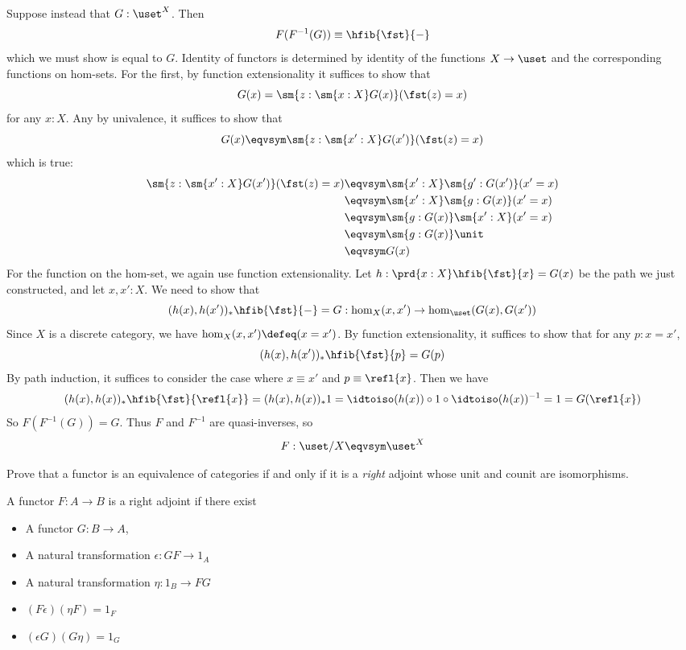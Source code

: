 Suppose instead that $G : \uset^{X}$.  Then
\[
  F(F^{-1}(G)) \equiv \hfib{\fst}{-}
\]
which we must show is equal to $G$.  Identity of functors is determined by
identity of the functions $X \to \uset$ and the corresponding functions on
hom-sets.  For the first, by function extensionality it suffices to show that
\[
  G(x)
  =
  \sm{z : \sm{x:X}G(x)}(\fst(z) = x)
\]
for any $x : X$.  Any by univalence, it suffices to show that 
\[
  G(x)
  \eqvsym
  \sm{z : \sm{x':X}G(x')}(\fst(z) = x)
\]
which is true:
\begin{align*}
  \sm{z : \sm{x':X}G(x')}(\fst(z) = x)
  &\eqvsym \sm{x':X}\sm{g':G(x')}(x'=x)
  \\&\eqvsym \sm{x':X}\sm{g:G(x)}(x'=x)
  \\&\eqvsym \sm{g:G(x)}\sm{x':X}(x'=x)
  \\&\eqvsym \sm{g:G(x)}\unit
  \\&\eqvsym G(x)
\end{align*}
For the function on the hom-set, we again use function extensionality.  Let $h
: \prd{x:X} \hfib{\fst}{x} = G(x)$ be the path we just constructed, and let
$x, x' : X$.  We need to show that
\[
  (h(x), h(x'))_{*}\hfib{\fst}{-} = G 
  : \hom_{X}(x, x') \to \hom_{\uset}(G(x), G(x'))
\]
Since $X$ is a discrete category, we have $\hom_{X}(x, x') \defeq (x = x')$.
By function extensionality, it suffices to show that for any $p : x = x'$,
\[
  (h(x), h(x'))_{*}\hfib{\fst}{p} = G(p)
\]
By path induction, it suffices to consider the case where $x \equiv x'$ and $p
\equiv \refl{x}$.  Then we have
\[
  (h(x), h(x))_{*}\hfib{\fst}{\refl{x}}
  =
  (h(x), h(x))_{*}1
  = 
  \idtoiso(h(x)) \circ 1 \circ \idtoiso(h(x))^{-1}
  =
  1
  =
  G(\refl{x})
\]
So $F(F^{-1}(G)) = G$.  Thus $F$ and $F^{-1}$ are quasi-inverses, so
\[
  F : \uset/X \eqvsym \uset^{X}
\]


Prove that a functor is an equivalence of categories if and only if it is a
\emph{right} adjoint whose unit and counit are isomorphisms.


 \soln
A functor $F : A \to B$ is a right adjoint if there exist



\begin{itemize}
\item  A functor $G : B \to A$,

\item  A natural transformation $\epsilon : GF \to 1_{A}$

\item  A natural transformation $\eta : 1_{B} \to FG$

\item  $(F\epsilon)(\eta F) = 1_{F}$

\item  $(\epsilon G)(G\eta) = 1_{G}$

\end{itemize}


